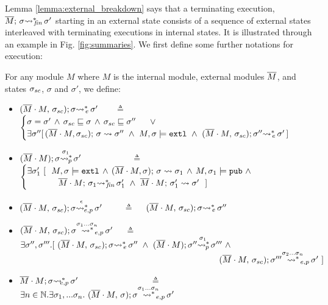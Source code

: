 Lemma \ref{lemma:external_breakdown} says that a terminating execution,  $ \leadstoBoundedStarFin {\Mtwo}  {\sigma}  {\sigma'}$ starting in an external state  consists of a sequence of  external states interleaved with terminating executions in internal states. 
It %
is illustrated through an example in Fig. \ref{fig:summaries}.
We first define some further notations for execution:

\begin{definition}
For any module $M$  where $M$ is the internal module, external modules $\Mtwo$, and states $\sigma\bd$,  $\sigma$ and $\sigma'$, we define:

\begin{itemize}
\item
 ${\leadstoBoundedThreeStarExt {\Mtwo\cdot M} {\sigma\bd}  {\sigma}  {\sigma'}}$ \ \ \ $\triangleq$ \ \ 
{
$
\begin{cases}
\sigma=\sigma' \, \wedge\,  \EarlierS  {\sigma\bd}  {\sigma} \, \wedge\,  \EarlierS  {\sigma\bd}  {\sigma''}\ \ \ \ \ \vee\\
\exists \sigma''[\,  \leadstoBoundedThree {\Mtwo\cdot M} {\sigma}  {\sigma\bd}   {\sigma''} \  \wedge\  M, \sigma  \models  \extThis\  \wedge\ 
{\leadstoBoundedThreeStarExt {\Mtwo\cdot M} {\sigma\bd}  {\sigma''}  {\sigma'}}\, ]
\end{cases}
$
}
\item
${\WithPub {\Mtwo\cdot M}    {\sigma}  {\sigma'} {\sigma_1}}$ \  \ \  \ \ \ \ \ \ \ \ $\triangleq$ \ \ 
$\begin{cases}
\exists   \sigma_1'\ [ \ \   M, \sigma  \models \extThis \, \wedge \,  \leadstoBoundedThree  {\Mtwo\cdot M} {\sigma} {\sigma}  {\sigma_{1}}\, \wedge\,  M, \sigma_1 \models \pubMeth \ \wedge \\ 
\strut \ \ \ \ \  \ \ \ \ \ \   \leadstoBoundedStarFin {\Mtwo\cdot M} {\sigma_1}  {\sigma_1'}  \ \wedge \   \leadstoBounded  {\Mtwo\cdot M} {\sigma_1'}      {\sigma'} \ \ ] 
\end{cases}
$
\item
$\WithExtPub {\Mtwo\cdot M} {\sigma\bd}  {\sigma}  {\sigma'} {\epsilon}$ \ \     \ \  $\triangleq$ \ \ 
$\leadstoBoundedThreeStarExt {\Mtwo\cdot M} {\sigma\bd}  {\sigma}  {\sigma''}$
\item
$\WithExtPub {\Mtwo\cdot M} {\sigma\bd}  {\sigma}  {\sigma'} {\sigma_1...\sigma_n}$   \ \  $\triangleq$ \ \ 
$\exists \sigma'',\sigma'''.[\   {\leadstoBoundedThreeStarExt {\Mtwo\cdot M} {\sigma\bd}  {\sigma}  {\sigma''}}\ \wedge\ 
{\WithPub {\Mtwo\cdot M}    {\sigma''}  {\sigma'''} {\sigma_1}} \ \wedge$\\   
$\strut \hspace{8.2cm} {\WithExtPub {\Mtwo\cdot M} {\sigma\bd}  {\sigma'''}  {\sigma'} {\sigma_2...\sigma_n} }  \ ]$
\item
$\leadstoBoundedExtPub {\Mtwo\cdot M}    {\sigma}  {\sigma'} $   \ \ \ \ \   \ \ \  \ \ \ \   \ \ \ \  $\triangleq$   \ \ 
  $ \exists n\in \mathbb{N}. \exists \sigma_1,...\sigma_n. \ \WithExtPub {\Mtwo\cdot M} {\sigma}  {\sigma}  {\sigma'} {\sigma_1...\sigma_n} 
$
\end{itemize}
\end{definition}

